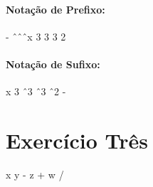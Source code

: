 \documentclass[
	article,			%
	11pt,				%
	oneside,			%
	a4paper,			%
	english,			%
	brazil,				%
	]{abntex2}
\begin{document}
        \paragraph{Notação de Prefixo:} - \^\ \^\ \^\ x 3 3 3 2 
        \paragraph{Notação de Sufixo:} x 3 \^\ 3 \^\ 3 \^\ 2 -
    \section{Exercício Três}
    
    x y - z + w /
\end{document}
